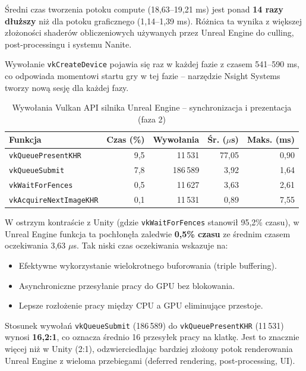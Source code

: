 Średni czas tworzenia potoku compute (18,63--19,21 ms) jest ponad \textbf{14 razy dłuższy} 
niż dla potoku graficznego (1,14--1,39 ms). Różnica ta 
wynika z większej złożoności shaderów obliczeniowych używanych przez Unreal Engine do culling, post-processingu i systemu Nanite.

Wywołanie \texttt{vkCreateDevice} pojawia się raz w każdej fazie z czasem 541--590 ms, co odpowiada momentowi startu gry w tej fazie -- narzędzie 
Nsight Systems tworzy nową sesję dla każdej fazy.

\begin{table}[H]
\centering
\caption{Wywołania Vulkan API silnika Unreal Engine -- synchronizacja i prezentacja (faza 2)}
\label{tab:unreal-vulkan-sync}
\small
\begin{tabular}{|l|r|r|r|r|}
\hline
\textbf{Funkcja} & \textbf{Czas (\%)} & \textbf{Wywołania} & \textbf{Śr. ($\mu$s)} & \textbf{Maks. (ms)} \\
\hline
\texttt{vkQueuePresentKHR} & 9,5 & 11\,531 & 77,05 & 0,90 \\
\texttt{vkQueueSubmit} & 7,8 & 186\,589 & 3,92 & 1,64 \\
\texttt{vkWaitForFences} & 0,5 & 11\,627 & 3,63 & 2,61 \\
\texttt{vkAcquireNextImageKHR} & 0,1 & 11\,531 & 0,89 & 7,55 \\
\hline
\end{tabular}
\end{table}

W ostrzym kontraście z Unity (gdzie \texttt{vkWaitForFences} stanowił 95,2\% czasu), w Unreal Engine funkcja ta pochłonęła zaledwie 
\textbf{0,5\% czasu} ze średnim czasem oczekiwania 3,63 $\mu$s. Tak niski czas oczekiwania wskazuje na:
\begin{itemize}
    \item Efektywne wykorzystanie wielokrotnego buforowania (triple buffering).
    \item Asynchroniczne przesyłanie pracy do GPU bez blokowania.
    \item Lepsze rozłożenie pracy między CPU a GPU eliminujące przestoje.
\end{itemize}

Stosunek wywołań \texttt{vkQueueSubmit} (186\,589) do \texttt{vkQueuePresentKHR} (11\,531) 
wynosi \textbf{16,2:1}, co oznacza średnio 16 
przesyłek pracy na klatkę. Jest to znacznie więcej niż w Unity (2:1), odzwierciedlając 
bardziej złożony potok renderowania Unreal Engine z 
wieloma przebiegami (deferred rendering, post-processing, UI).

